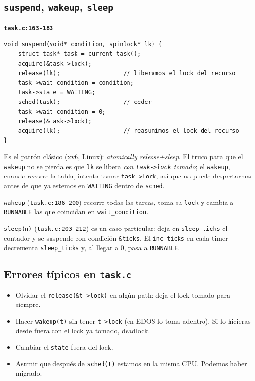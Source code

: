 \documentclass[11pt,a4paper]{article}
\begin{document}
\subsection*{\texttt{suspend}, \texttt{wakeup}, \texttt{sleep}}

\begin{walkthrough}
\textbf{\texttt{task.c:163-183}}

\begin{lstlisting}[style=cstyle]
void suspend(void* condition, spinlock* lk) {
    struct task* task = current_task();
    acquire(&task->lock);
    release(lk);                  // liberamos el lock del recurso
    task->wait_condition = condition;
    task->state = WAITING;
    sched(task);                  // ceder
    task->wait_condition = 0;
    release(&task->lock);
    acquire(lk);                  // reasumimos el lock del recurso
}
\end{lstlisting}

Es el patrón clásico (xv6, Linux): \emph{atomically release+sleep}.
El truco para que el \texttt{wakeup} no se pierda es que
\texttt{lk} se libera \emph{con \texttt{task->lock} tomado}; el
\texttt{wakeup}, cuando recorre la tabla, intenta tomar
\texttt{task->lock}, así que no puede despertarnos antes de que
ya estemos en \texttt{WAITING} dentro de \texttt{sched}.

\texttt{wakeup} (\texttt{task.c:186-200}) recorre todas las tareas,
toma su \texttt{lock} y cambia a \texttt{RUNNABLE} las que coincidan
en \texttt{wait\_condition}.

\texttt{sleep(n)} (\texttt{task.c:203-212}) es un caso particular:
deja en \texttt{sleep\_ticks} el contador y se suspende con
condición \texttt{\&ticks}. El \texttt{inc\_ticks} en cada timer
decrementa \texttt{sleep\_ticks} y, al llegar a 0, pasa a
\texttt{RUNNABLE}.
\end{walkthrough}

\subsection*{Errores típicos en \texttt{task.c}}

\begin{itemize}[leftmargin=*,nosep]
    \item Olvidar el \texttt{release(\&t->lock)} en algún path:
        deja el lock tomado para siempre.
    \item Hacer \texttt{wakeup(t)} sin tener \texttt{t->lock} (en
        EDOS lo toma adentro). Si lo hicieras desde fuera con el
        lock ya tomado, deadlock.
    \item Cambiar el \texttt{state} fuera del lock.
    \item Asumir que después de \texttt{sched(t)} estamos en la
        misma CPU. Podemos haber migrado.
\end{itemize}
\end{document}
